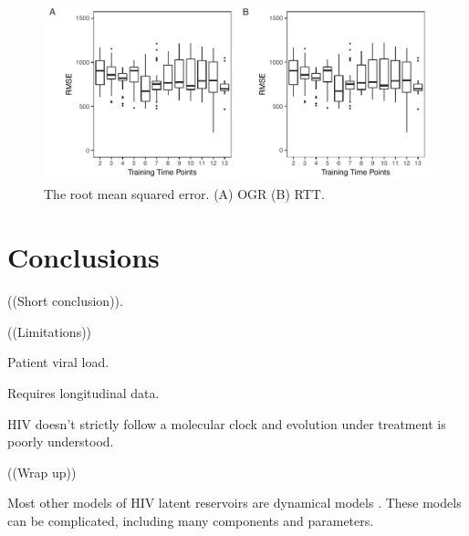 \documentclass[9pt,twocolumn,twoside,lineno]{pnas-new}
\begin{document}
\begin{figure}
\includegraphics{sensitivity}
\caption{The root mean squared error.
(A) OGR (B) RTT.}
\label{fig:sensrmse}
\end{figure}

\section*{Conclusions}
((Short conclusion)).

((Limitations))

Patient viral load.

Requires longitudinal data.

HIV doesn't strictly follow a molecular clock and evolution under treatment is poorly understood.

((Wrap up))

Most other models of HIV latent reservoirs are dynamical models \cite{Rong09,Pace11}. These models can be complicated, including many components and parameters.
\end{document}
